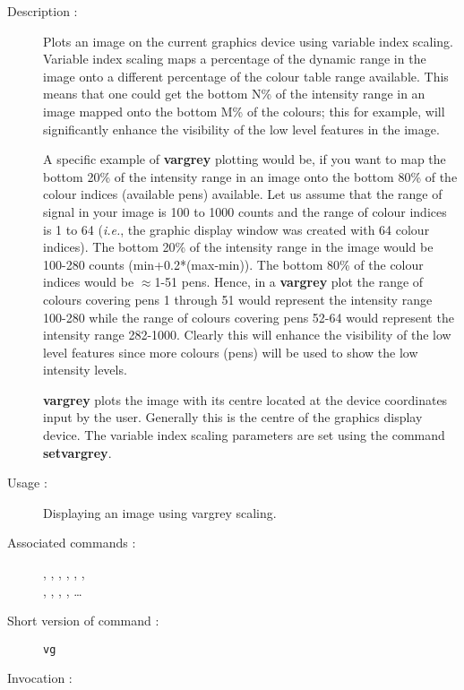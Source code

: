 \begin{description}

\item[Description :] Plots an image on the current graphics device
using variable index scaling.  Variable index scaling maps a percentage
of the dynamic range in the image onto a different percentage of the
colour table range available.  This means that one could get the bottom
N\% of the intensity range in an image mapped onto the bottom M\% of
the colours; this for example, will significantly enhance the
visibility of the low level features in the image.

A specific example of {\bf vargrey} plotting would be, if you want to
map the bottom 20\% of the intensity range in an image onto the bottom
80\% of the colour indices (available pens) available.  Let us assume
that the range of signal in your image is 100 to 1000 counts and the
range of colour indices is 1 to 64 (\emph{i.e.}, the graphic display
window was created with 64 colour indices).  The bottom 20\% of the
intensity range in the image would be 100-280 counts (min+0.2*(max-min)).
The bottom 80\% of the colour indices would be $\approx$1-51 pens.  
Hence, in a {\bf vargrey} plot the range of colours covering pens 1 
through 51 would represent the intensity range 100-280 while the range 
of colours covering pens 52-64 would represent
the intensity range 282-1000.  Clearly this will enhance the visibility
of the low level features since more colours (pens) will be used to
show the low intensity levels.

{\bf vargrey} plots the image with its centre located at the device
coordinates input by the user.  Generally this is the centre of the
graphics display device.  The variable index scaling parameters are set
using the command {\bf setvargrey}.

\item[Usage :] Displaying an image using vargrey scaling.

\item[Associated commands :] {\tt {}}, 
{\tt {}}, 
{\tt {}}, {\tt {}}, 
{\tt {}}, {\tt {}}, \\ 
{\tt {}}, {\tt {}}, 
{\tt {}}, {\tt {}}, \ldots 

\item[Short version of command :] {\tt vg}
\item[Invocation :]


\end{description}
